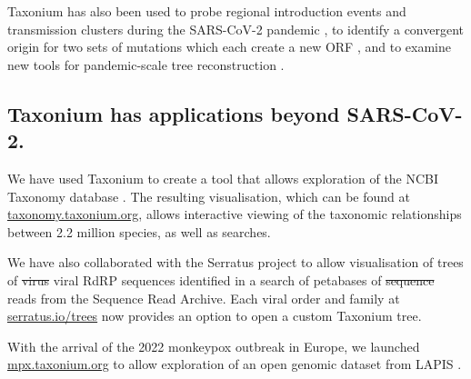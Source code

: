 \documentclass[twocolumn]{bioRxiv}
\providecommand{\DIFadd}[1]{{\protect\color{teal}#1}}
\providecommand{\DIFdel}[1]{{\protect\color{red}\sout{#1}}}
\providecommand{\DIFaddbegin}{}
\providecommand{\DIFaddend}{}
\providecommand{\DIFdelbegin}{}
\providecommand{\DIFdelend}{}
\begin{document}
Taxonium has also been used  to probe  regional introduction events and transmission clusters during the SARS-CoV-2 pandemic \citep{mcbroome2022identifying}, to identify a convergent origin for two sets of mutations which each create a new ORF \citep{Mears2022}, and to examine new tools for pandemic-scale tree reconstruction \citep{DeMaio2022}.



\subsection*{Taxonium has applications beyond SARS-CoV-2.}

We have used Taxonium to create a tool that allows exploration of the NCBI Taxonomy database \citep{federhen2012ncbi}. The resulting visualisation, which can be found at \href{http://taxonomy.taxonium.org}{taxonomy.taxonium.org}, allows interactive viewing of the taxonomic relationships between 2.2 million species, as well as searches.


We have also collaborated with the Serratus project \citep{edgar2022petabase} to allow visualisation of trees of \DIFdelbegin \DIFdel{virus }\DIFdelend \DIFaddbegin \DIFadd{viral RdRP }\DIFaddend sequences identified in a search of petabases of \DIFdelbegin \DIFdel{sequence }\DIFdelend \DIFaddbegin \DIFadd{reads }\DIFaddend from the Sequence Read Archive. Each viral order and family at \href{http://serratus.io/trees}{serratus.io/trees} now provides an option to open a custom Taxonium tree.

With the arrival of the 2022 monkeypox outbreak in Europe, we launched \href{http://mpx.taxonium.org}{mpx.taxonium.org} to allow exploration of an open genomic dataset from LAPIS \citep{lapis}.
\end{document}
